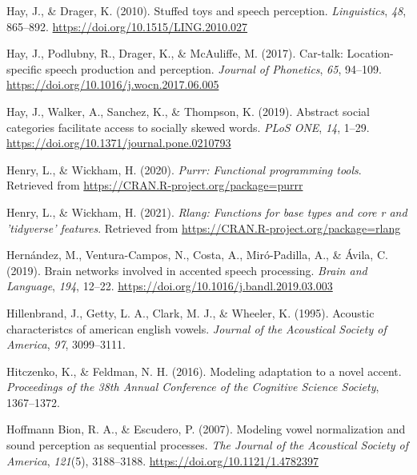 \documentclass[
  11pt,
  english,
  man,floatsintext]{apa6}
\newlength{\cslhangindent}
\newlength{\cslentryspacingunit} %
\newenvironment{CSLReferences}[2] %
 {%
  \setlength{\parindent}{0pt}
  \ifodd #1
  \let\oldpar\par
  \def\par{\hangindent=\cslhangindent\oldpar}
  \fi
  \setlength{\parskip}{#2\cslentryspacingunit}
 }%
 {}
\begin{document}
\begin{CSLReferences}{1}{0}
\leavevmode{}%
Hay, J., \& Drager, K. (2010). Stuffed toys and speech perception. \emph{Linguistics}, \emph{48}, 865--892. \url{https://doi.org/10.1515/LING.2010.027}

\leavevmode{}%
Hay, J., Podlubny, R., Drager, K., \& McAuliffe, M. (2017). Car-talk: Location-specific speech production and perception. \emph{Journal of Phonetics}, \emph{65}, 94--109. \url{https://doi.org/10.1016/j.wocn.2017.06.005}

\leavevmode{}%
Hay, J., Walker, A., Sanchez, K., \& Thompson, K. (2019). Abstract social categories facilitate access to socially skewed words. \emph{PLoS ONE}, \emph{14}, 1--29. \url{https://doi.org/10.1371/journal.pone.0210793}

\leavevmode{}%
Henry, L., \& Wickham, H. (2020). \emph{Purrr: Functional programming tools}. Retrieved from \url{https://CRAN.R-project.org/package=purrr}

\leavevmode{}%
Henry, L., \& Wickham, H. (2021). \emph{Rlang: Functions for base types and core r and 'tidyverse' features}. Retrieved from \url{https://CRAN.R-project.org/package=rlang}

\leavevmode{}%
Hernández, M., Ventura-Campos, N., Costa, A., Miró-Padilla, A., \& Ávila, C. (2019). Brain networks involved in accented speech processing. \emph{Brain and Language}, \emph{194}, 12--22. \url{https://doi.org/10.1016/j.bandl.2019.03.003}

\leavevmode{}%
Hillenbrand, J., Getty, L. A., Clark, M. J., \& Wheeler, K. (1995). Acoustic characteristcs of american english vowels. \emph{Journal of the Acoustical Society of America}, \emph{97}, 3099--3111.

\leavevmode{}%
Hitczenko, K., \& Feldman, N. H. (2016). Modeling adaptation to a novel accent. \emph{Proceedings of the 38th Annual Conference of the Cognitive Science Society}, 1367--1372.

\leavevmode{}%
Hoffmann Bion, R. A., \& Escudero, P. (2007). Modeling vowel normalization and sound perception as sequential processes. \emph{The Journal of the Acoustical Society of America}, \emph{121}(5), 3188--3188. \url{https://doi.org/10.1121/1.4782397}


\end{CSLReferences}
\end{document}
